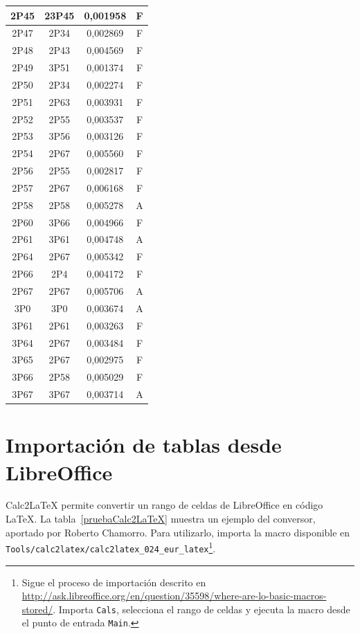 \begin{center}
\begin{longtable}{|c|c|c|c|}
    \hline	2P45	&	23P45	&	0,001958	&	F	\\
    \hline	2P47	&	2P34	&	0,002869	&	F	\\
    \hline	2P48	&	2P43	&	0,004569	&	F	\\
    \hline	2P49	&	3P51	&	0,001374	&	F	\\
    \hline	2P50	&	2P34	&	0,002274	&	F	\\
    \hline	2P51	&	2P63	&	0,003931	&	F	\\
    \hline	2P52	&	2P55	&	0,003537	&	F	\\
    \hline	2P53	&	3P56	&	0,003126	&	F	\\
    \hline	2P54	&	2P67	&	0,005560	&	F	\\
    \hline	2P56	&	2P55	&	0,002817	&	F	\\
    \hline	2P57	&	2P67	&	0,006168	&	F	\\
    \hline	2P58	&	2P58	&	0,005278	&	A	\\
    \hline	2P60	&	3P66	&	0,004966	&	F	\\
    \hline	2P61	&	3P61	&	0,004748	&	A	\\
    \hline	2P64	&	2P67	&	0,005342	&	F	\\
    \hline	2P66	&	2P4	&	0,004172	&	F	\\
    \hline	2P67	&	2P67	&	0,005706	&	A	\\
    \hline	3P0	&	3P0	&	0,003674	&	A	\\
    \hline	3P61	&	2P61	&	0,003263	&	F	\\
    \hline	3P64	&	2P67	&	0,003484	&	F	\\
    \hline	3P65	&	2P67	&	0,002975	&	F	\\
    \hline	3P66	&	2P58	&	0,005029	&	F	\\
    \hline	3P67	&	3P67	&	0,003714	&	A	\\
	\end{longtable}
\end{center}


\section{Importación de tablas desde LibreOffice}
\label{sec:calc2latex}

Calc2LaTeX permite convertir un rango de celdas de LibreOffice en código \LaTeX{}. La tabla~\ref{pruebaCalc2LaTeX} muestra un ejemplo del conversor, aportado por Roberto Chamorro. Para utilizarlo, importa la macro disponible en \texttt{Tools/calc2latex/calc2latex\_024\_eur\_latex}\footnote{Sigue el proceso de importación descrito en \url{http://ask.libreoffice.org/en/question/35598/where-are-lo-basic-macros-stored/}. Importa \texttt{Cals}, selecciona el rango de celdas y ejecuta la macro desde el punto de entrada \texttt{Main}.}.

